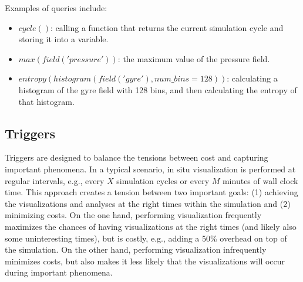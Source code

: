 Examples of queries include:
\begin{itemize}
\item $cycle()$: calling a function that returns the current simulation cycle and storing it into a variable.
\item $max(field('pressure'))$: the maximum value of the pressure field.
\item $entropy(histogram(field('gyre'), num\_bins=128))$: calculating a histogram of the gyre field with 128 bins, and then calculating the entropy of that histogram.
\end{itemize}
%

%
%

\subsection{Triggers}
\label{sec:ascent:triggers}

Triggers are designed to balance the tensions between cost and capturing important phenomena.
%
In a typical scenario, in situ visualization is performed at regular intervals, e.g.,
every $X$ simulation cycles or every $M$ minutes of wall clock time.
%
This approach creates a tension between two important goals:
(1) achieving the visualizations and analyses at the right times within the simulation
and (2) minimizing costs.
%
On the one hand, performing visualization frequently maximizes the chances of having
visualizations at the right times (and likely also some uninteresting times), but
is costly,  e.g., adding a 50\% overhead on top of the simulation.
%
On the other hand, performing visualization infrequently minimizes costs, but also makes it
less likely that the visualizations will occur during important phenomena.
%

